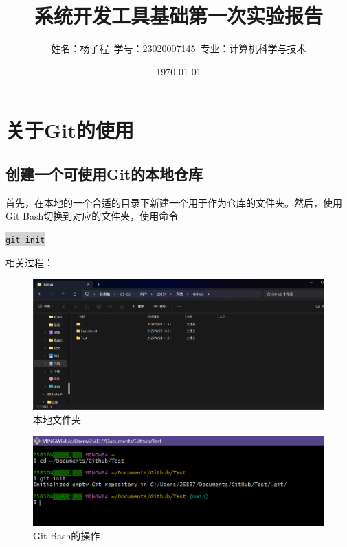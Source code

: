 \documentclass[a4paper, 12pt]{article}
\begin{document}
  \title{系统开发工具基础第一次实验报告}
  \author{姓名：杨子程\ 学号：23020007145\ 专业：计算机科学与技术}
  \date{\today}
  \maketitle

  \tableofcontents
  \newpage

  \section{关于Git的使用}
  \subsection{创建一个可使用Git的本地仓库}

首先，在本地的一个合适的目录下新建一个用于作为仓库的文件夹。然后，使用Git Bash切换到对应的文件夹，使用命令

\colorbox{lightgray}{\texttt{git init}}

相关过程：

\begin{figure}[h]
  \centering
  \includegraphics[width=1\textwidth]{im1}
  \caption{本地文件夹}
  \label{image-myimage}
\end{figure}

\begin{figure}[h]
  \centering
  \includegraphics[width=1\textwidth]{im2}
  \caption{Git Bash的操作}
  \label{image-myimage}
\end{figure}
\end{document}
